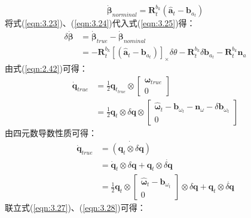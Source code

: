 \begin{equation}
\label{eqn:3.25}
\dot{\bm{\beta}}_{norminal} = \mathbf{R}_t^{b_k}(\hat{\mathbf{a}}_t-\mathbf{b}_{a_t})
\end{equation}
将式(\ref{eqn:3.23})、(\ref{eqn:3.24})代入式(\ref{eqn:3.25})得：
\begin{equation}
\label{eqn:3.26}
\begin{aligned}
\delta \dot{\bm{\beta}} &= \dot{\bm{\beta}}_{true}-\dot{\bm{\beta}}_{nominal} \\
&= -\mathbf{R}_{t}^{b_{k}} [\left(\hat{\mathbf{a}}_{t}-\mathbf{b}_{a_{t}}\right)]_{\times} \delta \theta - \mathbf{R}_{t}^{b_{k}} \delta \mathbf{b}_{a_{t}} - \mathbf{R}_{t}^{b_{k}} \mathbf{n}_{a}
\end{aligned}
\end{equation}
由式(\ref{eqn:2.42})可得：
\begin{equation}
\label{eqn:3.27}
\begin{aligned}
\dot{\mathbf{q}}_{true} &= \frac{1}{2} \mathbf{q}_{t_{true}} \otimes \left[ \begin{array}{c}{\bm{\omega}_{true}} \\ {0}\end{array}\right] \\
&= \frac{1}{2} \mathbf{q}_{t} \otimes \delta \mathbf{q} \otimes \left[ \begin{array}{c}{\hat{\bm{\omega}}_{t}-\mathbf{b}_{\omega_{t}}-\mathbf{n}_{\omega}-\delta \mathbf{b}_{\omega_{t}}} \\ {0}\end{array}\right]
\end{aligned}
\end{equation}
由四元数导数性质可得：
\begin{equation}
\label{eqn:3.28}
\begin{aligned}
\dot{\mathbf{q}}_{true} &= \dot{(\mathbf{q}_{t} \otimes \delta \mathbf{q}) } \\
&= \dot{\mathbf{q}}_{t} \otimes \delta \mathbf{q} + \mathbf{q}_{t} \otimes \dot{\delta \mathbf{q}} \\
&= \frac{1}{2} \mathbf{q}_{t} \otimes \left[ \begin{array}{c}{\hat{\bm{\omega}}_{t}-\mathbf{b}_{\omega_{t}}} \\ {0}\end{array}\right] \otimes \delta \mathbf{q}+\mathbf{q}_{t} \otimes \dot{\delta \mathbf{q}} 
\end{aligned}
\end{equation}
联立式(\ref{eqn:3.27})、(\ref{eqn:3.28})可得：
